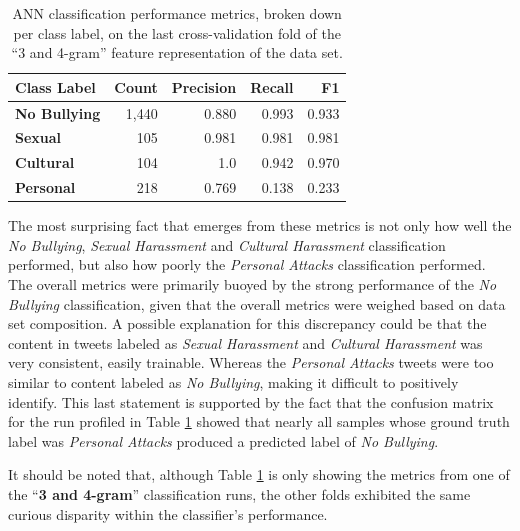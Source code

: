 \documentclass[conference]{sig-alternate-05-2015}
\begin{document}
\begin{table}[ht!]
  \centering
  \begin{tabular}{| l | r | r | r | r |}
    \hline
    \textbf{Class Label} & \textbf{Count} & \textbf{Precision} & \textbf{Recall} & \textbf{F1} \\
    \hline\hline
    \textbf{No Bullying} & 1,440 & 0.880 & 0.993 & 0.933 \\
    \hline
    \textbf{Sexual} & 105 & 0.981 & 0.981 & 0.981 \\
    \hline
    \textbf{Cultural} & 104 & 1.0 & 0.942 & 0.970 \\
    \hline
    \textbf{Personal} & 218 & 0.769 & 0.138 & 0.233 \\
    \hline
  \end{tabular}
  \caption{ANN classification performance metrics, broken down per class label,
  on the last cross-validation fold of the ``3 and 4-gram'' feature
  representation of the data set.}
  \label{tab:ann_byclass_results}
\end{table}

The most surprising fact that emerges from these metrics is not only how well
the \textit{No Bullying}, \textit{Sexual Harassment} and \textit{Cultural
Harassment} classification performed, but also how poorly the \textit{Personal
Attacks} classification performed. The overall metrics were primarily buoyed by
the strong performance of the \textit{No Bullying} classification, given that
the overall metrics were weighed based on data set composition. A possible
explanation for this discrepancy could be that the content in tweets labeled
as \textit{Sexual Harassment} and \textit{Cultural Harassment} was very
consistent, easily trainable. Whereas the \textit{Personal Attacks} tweets were
too similar to content labeled as \textit{No Bullying}, making it difficult to
positively identify. This last statement is supported by the fact that the
confusion matrix for the run profiled in Table \ref{tab:ann_byclass_results}
showed that nearly all samples whose ground truth label was \textit{Personal
Attacks} produced a predicted label of \textit{No Bullying}.\par

It should be noted that, although Table \ref{tab:ann_byclass_results} is only
showing the metrics from one of the ``\textbf{3 and 4-gram}'' classification
runs, the other folds exhibited the same curious disparity within the
classifier's performance.\par
\end{document}
